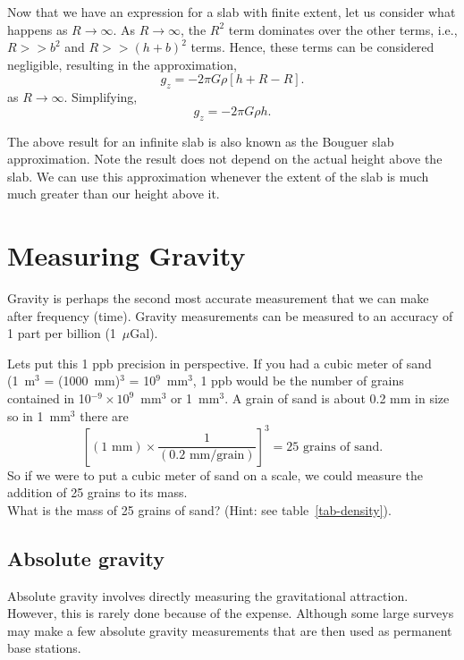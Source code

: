 Now that we have an expression for a slab with finite extent, let us consider what happens as $R \to \infty$.  As $R \to \infty$, the $R^2$ term dominates over the other terms, i.e., $R >> b^2$ and $R >>(h + b)^2$ terms.  Hence, these terms can be considered negligible, resulting in the approximation,
\begin{equation*}
    g_z = -2 \pi G \rho [h + R - R] .
\end{equation*}
as $R \to \infty$.  Simplifying,
\begin{equation}
    g_z = -2 \pi G \rho h .
\end{equation}

The above result for an infinite slab is also known as the Bouguer slab approximation.  Note the result does not depend on the actual height above the slab.  We can use this approximation whenever the extent of the slab is much much greater than our height above it.


\section{Measuring Gravity}
Gravity is perhaps the second most accurate measurement that we can make after frequency (time).  Gravity measurements can be measured to an accuracy of 1 part per billion (1~$\mu$Gal).
\begin{framed}
 Lets put this 1 ppb precision in perspective.  If you had a cubic meter of sand (1~m$^{3}$ = (1000~mm)$^{3}$ = 10$^{9}$~mm$^{3}$, 1 ppb would be the number of grains contained in 10$^{-9} \times 10^{9}$~mm$^{3}$ or 1~mm$^{3}$.  A grain of sand is about 0.2 mm in size so in 1~mm$^{3}$ there are
\begin{equation*}
    \left[ (1 \mbox{ mm}) \times \frac{1}{(0.2 \mbox{ mm/grain})} \right]^{3} =
    25 \mbox{ grains of sand}. \nonumber
\end{equation*}
So if we were to put a cubic meter of sand on a scale, we could measure the
addition of 25 grains to its mass.
\\

What is the mass of 25 grains of sand? (Hint: see table~\ref{tab-density}).
\end{framed}

\subsection{Absolute gravity}
Absolute gravity involves directly measuring the gravitational attraction.  However, this is rarely done because of the expense.  Although some large surveys may make a few absolute gravity measurements that are then used as permanent base stations.

